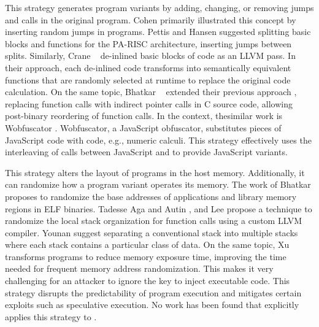 \begin{strategy}
    \label{jumps}
    This strategy generates program variants by adding, changing, or removing jumps and calls in the original program. 
    Cohen \cite{cohen1993operating} primarily illustrated this concept by inserting random jumps in programs. Pettis and Hansen \cite{pettisochhansen} suggested splitting basic blocks and functions for the PA-RISC architecture, inserting jumps between splits.
    Similarly, Crane \etal~\cite{crane2015thwarting} de-inlined basic blocks of code as an LLVM pass. 
    In their approach, each de-inlined code transforms into semantically equivalent functions that are randomly selected at runtime to replace the original code calculation. 
    On the same topic, Bhatkar \etal~\cite{bhatkar2005efficient} extended their previous approach \cite{bhatkar03}, replacing function calls with indirect pointer calls in C source code, allowing post-binary reordering of function calls. 
    In the \Wasm context, thesimilar work is Wobfuscator \cite{wobfuscator}.
    Wobfuscator, a JavaScript obfuscator, substitutes pieces of JavaScript code with \Wasm code, e.g., numeric calculi.
    This strategy effectively uses the interleaving of calls between JavaScript and \Wasm to provide JavaScript variants.
\end{strategy}


\begin{strategy}
    \label{mem_strategy}
    This strategy alters the layout of programs in the host memory. 
    Additionally, it can randomize how a program variant operates its memory. 
    The work of Bhatkar \etal \cite{bhatkar03, bhatkar2005efficient} proposes to randomize the base addresses of applications and library memory regions in ELF binaries. 
    Tadesse Aga and Autin \cite{aga2019smokestack}, and Lee \etal \cite{lee2021savior} propose a technique to randomize the local stack organization for function calls using a custom LLVM compiler.
    Younan \etal \cite{Younan2006} suggest separating a conventional stack into multiple stacks where each stack contains a particular class of data. 
    On the same topic, Xu \etal \cite{xu2020merr} transforms programs to reduce memory exposure time, improving the time needed for frequent memory address randomization. 
    This makes it very challenging for an attacker to ignore the key to inject executable code. 
    This strategy disrupts the predictability of program execution and mitigates certain exploits such as speculative execution.
    No work has been found that explicitly applies this strategy to \Wasm.
\end{strategy}

